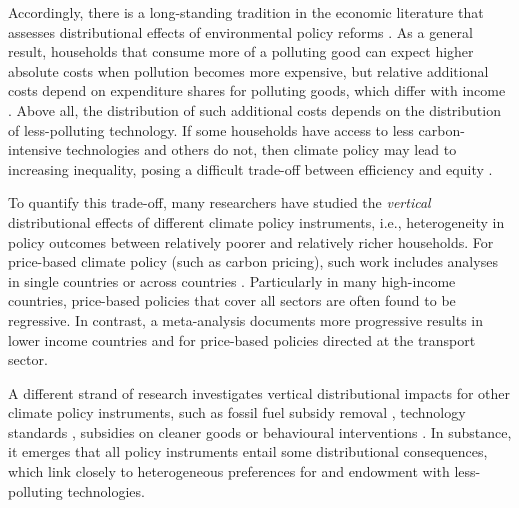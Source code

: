 \documentclass[12pt, a4paper]{article}
\begin{document}
Accordingly, there is a long-standing tradition in the economic literature that assesses distributional effects of environmental policy reforms \autocite{Cremer.2003,Poterba.1991,Sandmo.1975,Stiglitz.2019}. As a general result, households that consume more of a polluting good can expect higher absolute costs when pollution becomes more expensive, but relative additional costs depend on expenditure shares for polluting goods, which differ with income \autocite{Jacobs.2019,Dorband.2019}. Above all, the distribution of such additional costs depends on the distribution of less-polluting technology. If some households have access to less carbon-intensive technologies and others do not, then climate policy may lead to increasing inequality, posing a difficult trade-off between efficiency and equity \autocite{Hansel.2022,TerryDinan.2016}. 

To quantify this trade-off, many researchers have studied the \textit{vertical} distributional effects of different climate policy instruments, i.e., heterogeneity in policy outcomes between relatively poorer and relatively richer households. For price-based climate policy (such as carbon pricing), such work includes analyses in single countries \autocite{Goulder.2019,Grainger.2010,Rausch.2011,Garaffa.2021,Sterner.2012,Wu.2022} or across countries \autocite{Budolfson.2021,Feindt.2021,Dorband.2019,Steckel.2021b,VogtSchilb.2019,Missbach.2024}. Particularly in many high-income countries, price-based policies that cover all sectors are often found to be regressive. In contrast, a meta-analysis \autocite{Ohlendorf.2021} documents more progressive results in lower income countries and for price-based policies directed at the transport sector.

A different strand of research investigates vertical distributional impacts for other climate policy instruments, such as fossil fuel subsidy removal \autocite{Schaffitzel.2019,Giuliano.2020,DelArzeGranado.2012}, technology standards \autocite{Levinson.2019,Zhao.2022,Bruegge.2019}, subsidies on cleaner goods \autocite{Borenstein.2016,Vaishnav.2017,Winter.2019} or behavioural interventions \autocite{DellaValle.2020,Liebe.2021}. In substance, it emerges that all policy instruments entail some distributional consequences, which link closely to heterogeneous preferences for and endowment with less-polluting technologies. 
\end{document}
